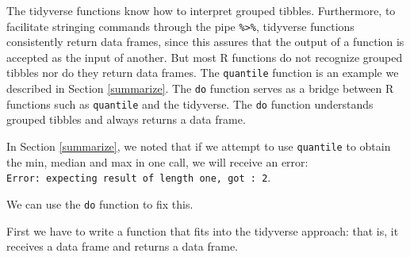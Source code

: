 \documentclass[
]{krantz}
\newenvironment{Shaded}{\begin{snugshade}}{\end{snugshade}}
\newcommand{\ControlFlowTok}[1]{\textcolor[rgb]{0.27,0.27,0.27}{\textbf{#1}}}
\newcommand{\DataTypeTok}[1]{\textcolor[rgb]{0.27,0.27,0.27}{#1}}
\newcommand{\DecValTok}[1]{\textcolor[rgb]{0.06,0.06,0.06}{#1}}
\newcommand{\FloatTok}[1]{\textcolor[rgb]{0.06,0.06,0.06}{#1}}
\newcommand{\KeywordTok}[1]{\textcolor[rgb]{0.27,0.27,0.27}{\textbf{#1}}}
\newcommand{\NormalTok}[1]{#1}
\newcommand{\OperatorTok}[1]{\textcolor[rgb]{0.43,0.43,0.43}{\textbf{#1}}}
\newcommand{\StringTok}[1]{\textcolor[rgb]{0.5,0.5,0.5}{#1}}
\begin{document}
The tidyverse functions know how to interpret grouped tibbles. Furthermore, to facilitate stringing commands through the pipe \texttt{\%\textgreater{}\%}, tidyverse functions consistently return data frames, since this assures that the output of a function is accepted as the input of another. But most R functions do not recognize grouped tibbles nor do they return data frames. The \texttt{quantile} function is an example we described in Section \ref{summarize}. The \texttt{do} function serves as a bridge between R functions such as \texttt{quantile} and the tidyverse. The \texttt{do} function understands grouped tibbles and always returns a data frame.

In Section \ref{summarize}, we noted that if we attempt to use \texttt{quantile} to obtain the min, median and max in one call, we will receive an error: \texttt{Error:\ expecting\ result\ of\ length\ one,\ got\ :\ 2}.

\begin{Shaded}
\end{Shaded}

We can use the \texttt{do} function to fix this.

First we have to write a function that fits into the tidyverse approach: that is, it receives a data frame and returns a data frame.

\begin{Shaded}
\end{Shaded}
\end{document}
